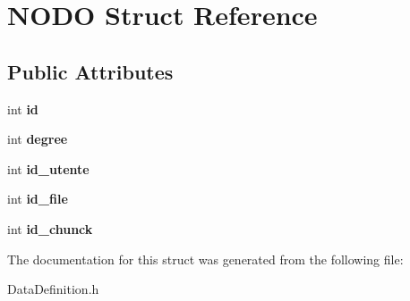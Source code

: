 \hypertarget{structNODO}{\section{N\-O\-D\-O Struct Reference}
\label{structNODO}
}
\subsection*{Public Attributes}
\begin{DoxyCompactItemize}
\item 
\hypertarget{structNODO_a363311f2eac0f019bb559decee9d283a}{int {\bfseries id}}\label{structNODO_a363311f2eac0f019bb559decee9d283a}

\item 
\hypertarget{structNODO_ac347f94dfc5042c7a35b5a2ae30796c3}{int {\bfseries degree}}\label{structNODO_ac347f94dfc5042c7a35b5a2ae30796c3}

\item 
\hypertarget{structNODO_a3d58b6fffbdc9fa4dd781d6e5d775ce5}{int {\bfseries id\-\_\-utente}}\label{structNODO_a3d58b6fffbdc9fa4dd781d6e5d775ce5}

\item 
\hypertarget{structNODO_ad1f3355d97fd04e0d908dc196bbf07af}{int {\bfseries id\-\_\-file}}\label{structNODO_ad1f3355d97fd04e0d908dc196bbf07af}

\item 
\hypertarget{structNODO_afff09f10bea60ea56ef2ee708a876017}{int {\bfseries id\-\_\-chunck}}\label{structNODO_afff09f10bea60ea56ef2ee708a876017}

\end{DoxyCompactItemize}


The documentation for this struct was generated from the following file\-:\begin{DoxyCompactItemize}
\item 
Data\-Definition.\-h\end{DoxyCompactItemize}

